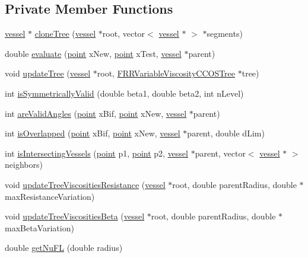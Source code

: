 \subsection*{Private Member Functions}
\begin{DoxyCompactItemize}
\item 
\hyperlink{structvessel}{vessel} $\ast$ \hyperlink{class_f_r_r_variable_viscosity_c_c_o_s_tree_ad3e31410f4bedfed9583ec2a4327a6f0}{clone\+Tree} (\hyperlink{structvessel}{vessel} $\ast$root, vector$<$ \hyperlink{structvessel}{vessel} $\ast$ $>$ $\ast$segments)
\item 
double \hyperlink{class_f_r_r_variable_viscosity_c_c_o_s_tree_aeb393ac0c5c6f613cdb74d2ebf810fd5}{evaluate} (\hyperlink{structpoint}{point} x\+New, \hyperlink{structpoint}{point} x\+Test, \hyperlink{structvessel}{vessel} $\ast$parent)
\item 
void \hyperlink{class_f_r_r_variable_viscosity_c_c_o_s_tree_a3570db190328db4b36c9dc0f11dd0acc}{update\+Tree} (\hyperlink{structvessel}{vessel} $\ast$root, \hyperlink{class_f_r_r_variable_viscosity_c_c_o_s_tree}{F\+R\+R\+Variable\+Viscosity\+C\+C\+O\+S\+Tree} $\ast$tree)
\item 
int \hyperlink{class_f_r_r_variable_viscosity_c_c_o_s_tree_a1842b7aeefcc3a4b897a31e97b50e5f8}{is\+Symmetrically\+Valid} (double beta1, double beta2, int n\+Level)
\item 
int \hyperlink{class_f_r_r_variable_viscosity_c_c_o_s_tree_a280e60fa0cf8ba69d6ba63915dbc5bc5}{are\+Valid\+Angles} (\hyperlink{structpoint}{point} x\+Bif, \hyperlink{structpoint}{point} x\+New, \hyperlink{structvessel}{vessel} $\ast$parent)
\item 
int \hyperlink{class_f_r_r_variable_viscosity_c_c_o_s_tree_aef4130378e6cd56cd25b2a08666ba16c}{is\+Overlapped} (\hyperlink{structpoint}{point} x\+Bif, \hyperlink{structpoint}{point} x\+New, \hyperlink{structvessel}{vessel} $\ast$parent, double d\+Lim)
\item 
int \hyperlink{class_f_r_r_variable_viscosity_c_c_o_s_tree_adff03d00f1bf103347494c34723942dc}{is\+Intersecting\+Vessels} (\hyperlink{structpoint}{point} p1, \hyperlink{structpoint}{point} p2, \hyperlink{structvessel}{vessel} $\ast$parent, vector$<$ \hyperlink{structvessel}{vessel} $\ast$ $>$ neighbors)
\item 
void \hyperlink{class_f_r_r_variable_viscosity_c_c_o_s_tree_a645828c1f6f7e4911b00bfde716ca2a6}{update\+Tree\+Viscosities\+Resistance} (\hyperlink{structvessel}{vessel} $\ast$root, double parent\+Radius, double $\ast$max\+Resistance\+Variation)
\item 
void \hyperlink{class_f_r_r_variable_viscosity_c_c_o_s_tree_a4128f3bd829768ad3088b0c47e7424df}{update\+Tree\+Viscosities\+Beta} (\hyperlink{structvessel}{vessel} $\ast$root, double parent\+Radius, double $\ast$max\+Beta\+Variation)
\item 
double \hyperlink{class_f_r_r_variable_viscosity_c_c_o_s_tree_a1982d2342edab65e9796931f6dc95ca0}{get\+Nu\+FL} (double radius)
\end{DoxyCompactItemize}
